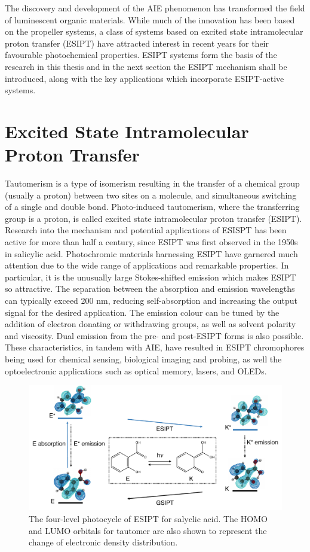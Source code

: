 The discovery and development of the AIE phenomenon has transformed the field of luminescent organic materials. While much of the innovation has been based on the propeller systems, a class of systems based on excited state intramolecular proton transfer (ESIPT) have attracted interest in recent years for their favourable photochemical properties. ESIPT systems form the basis of the research in this thesis and in the next section the ESIPT mechanism shall be introduced, along with the key applications which incorporate ESIPT-active systems.
\section{Excited State Intramolecular Proton Transfer}\label{section: lom ESIPT}
Tautomerism is a type of isomerism resulting in the transfer of a chemical group (usually a proton) between two sites on a molecule, and simultaneous switching of a single and double bond. Photo-induced tautomerism, where the transferring group is a proton, is called excited state intramolecular proton transfer (ESIPT). Research into the mechanism and potential applications of ESISPT has been active for more than half a century, since ESIPT was first observed in the 1950s in salicylic acid. Photochromic materials harnessing ESIPT have garnered much attention due to the wide range of applications and remarkable properties. In particular, it is the unusually large Stokes-shifted emission which makes ESIPT so attractive. The separation between the absorption and emission wavelengths can typically exceed 200 nm, reducing self-absorption and increasing the output signal for the desired application. The emission colour can be tuned by the addition of electron donating or withdrawing groups, as well as solvent polarity and viscosity.\cite{Azarias2016,Yushchenko2007} Dual emission from the pre- and post-ESIPT forms is also possible. These characteristics, in tandem with AIE, have resulted in ESIPT chromophores being used for chemical sensing, biological imaging and probing, as well the optoelectronic applications such as optical memory, lasers, and OLEDs.\cite{Hsieh2010,Kwon2011,Zhao2012,Demchenko2013,Padalkar2015,Chen2018}
\begin{figure}[H]
\centering
  \includegraphics[width=0.95\linewidth]{Intro/ESIPT.pdf}
  \caption[The four-level photocycle of ESIPT]{The four-level photocycle of ESIPT for salyclic acid. The HOMO and LUMO orbitals for tautomer are also shown to represent the change of electronic density distribution.}
  \label{figure: ESIPT}
\end{figure}
